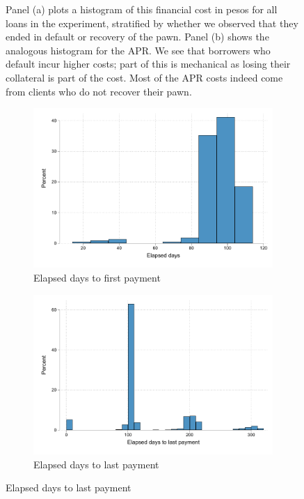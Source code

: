 \begin{figure}[!h]
 \scriptsize{Panel (a) plots a histogram of this financial cost in pesos for all loans in the experiment, stratified by whether we observed that they ended in default or recovery of the pawn. Panel (b) shows the analogous histogram for the APR.
We see that borrowers who default incur higher costs; part of this is mechanical as losing their collateral is part of the cost. Most of the APR costs indeed come from clients who do not recover their pawn.}
    
\end{figure}

\begin{figure}[!h]
    \caption{Behavior of borrowers who lost their pawn}
    \label{proxy_naive}
    \begin{center}
    \begin{subfigure}{0.35\textwidth}
        \caption{Elapsed days to first payment}
        \centering
        \includegraphics[width=\textwidth]{Figuras/hist_firstdays_default.pdf}
    \end{subfigure}
    \begin{subfigure}{0.35\textwidth}
        \caption{Elapsed days to last payment}
        \centering
        \includegraphics[width=\textwidth]{Figuras/hist_days_default.pdf}

\end{subfigure}
\end{center}
\end{figure}

